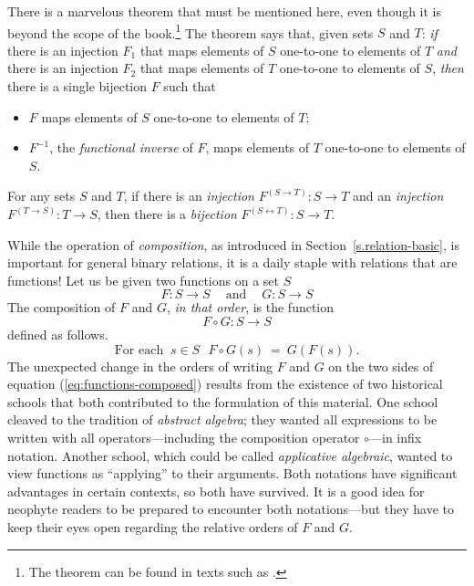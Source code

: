 There is a marvelous theorem that must be mentioned here, even though
it is beyond the scope of the book.\footnote{The theorem can be found
  in texts such as \cite{Birkhoff-MacLane53}.}
%
The theorem says that, given sets $S$ and $T$: {\em if} there is an
injection $F_1$ that maps elements of $S$ one-to-one to elements of
$T$ {\em and} there is an injection $F_2$ that maps elements of $T$
one-to-one to elements of $S$, {\em then} there is a single bijection
$F$ such that
\begin{itemize}
\item
$F$ maps elements of $S$ one-to-one to elements of $T$;
\item
$F^{-1}$, the {\it functional inverse} of $F$,
maps elements of $T$ one-to-one to elements of $S$.
\end{itemize}

\begin{theorem}
For any sets $S$ and $T$, if there is an {\em injection} $F^{(S
  \rightarrow T)}: S \rightarrow T$ and an {\em injection} $F^{(T
  \rightarrow S)}: T \rightarrow S$, then there is a {\em bijection}
$F^{(S \leftrightarrow T)}: S \rightarrow T$.
\end{theorem}

\medskip

While the operation of {\it composition},
as introduced in Section~\ref{s.relation-basic}, is important for
general binary relations, it is a daily staple with relations that are
functions!  Let us be given two functions on a set $S$
\[
F: S \rightarrow S \ \ \ \ \mbox{ and } \ \ \ \ G: S \rightarrow S
\]
The composition of $F$ and $G$, {\em in that order}, is the function
\[ F \circ G: S \rightarrow S \]
defined as follows.
\begin{equation}
\label{eq:functions-composed}
\mbox{For each } \ s \in S \ \ \
F \circ G(s) \ = \ G(F(s)).
\end{equation}
The unexpected change in the orders of writing $F$ and $G$ on the two
sides of equation (\ref{eq:functions-composed}) results from the
existence of two historical schools that both contributed to the
formulation of this material.
One school cleaved to the tradition of {\it abstract algebra}; they
wanted all expressions to be written with all operators---including
the composition operator $\circ$---in infix notation.  Another school,
which could be called {\it applicative algebraic}, wanted to view
functions as ``applying'' to their arguments.  Both notations have
significant advantages in certain contexts, so both have survived.  It
is a good idea for neophyte readers to be prepared to encounter both
notations---but they have to keep their eyes open regarding the
relative orders of $F$ and $G$.

